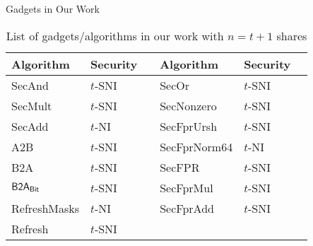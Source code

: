\begin{frame}{Gadgets in Our Work}

\begin{table}
\centering
	\begin{tabular}{l l | l l} 
	\toprule
	\textbf{Algorithm} & \textbf{Security$\quad$} & \textbf{Algorithm} & \textbf{Security$\quad$} \\
	\midrule
	{\sf SecAnd} & $t$-SNI & {\sf SecOr} & $t$-SNI \\
	{\sf SecMult} & $t$-SNI & {\sf SecNonzero} & $t$-SNI \\
	{\sf SecAdd} & $t$-NI & {\sf SecFprUrsh} & $t$-SNI \\
	{\sf A2B} & $t$-SNI & {\sf SecFprNorm64} & $t$-NI\\
	{\sf B2A} & $t$-SNI & {\sf SecFPR} & $t$-SNI \\
	${\sf B2A_{Bit}}$ & $t$-SNI & {\sf SecFprMul} & $t$-SNI\\
	{\sf RefreshMasks} & $t$-NI & {\sf SecFprAdd} & $t$-SNI\\
	{\sf Refresh} & $t$-SNI \\
	\bottomrule
	\end{tabular}
\caption{List of gadgets/algorithms in our work with $n=t+1$ shares}
\label{table:gadgets_secureity}
\end{table}
\end{frame}



